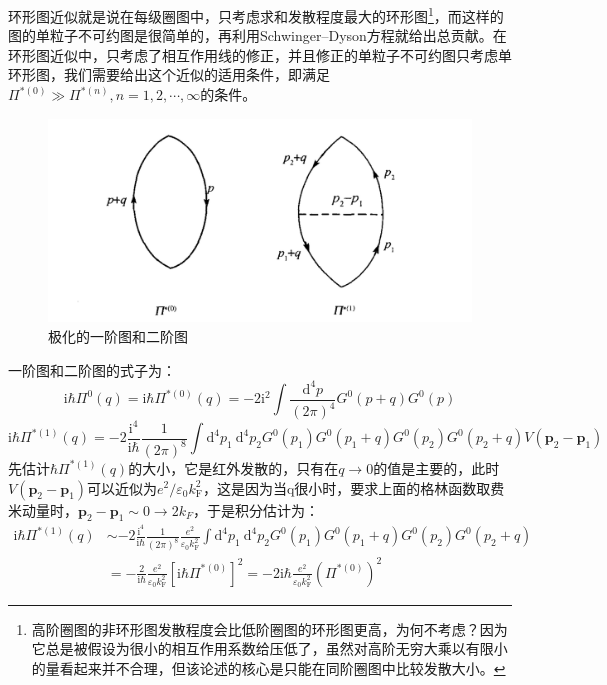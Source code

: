 \documentclass[10pt,openany]{book}
\theoremstyle{thmstyle} %
\theoremstyle{defstyle} %
\theoremstyle{prostyle} %
\begin{document}
环形图近似就是说在每级圈图中，只考虑求和发散程度最大的环形图\footnote{高阶圈图的非环形图发散程度会比低阶圈图的环形图更高，为何不考虑？因为它总是被假设为很小的相互作用系数给压低了，虽然对高阶无穷大乘以有限小的量看起来并不合理，但该论述的核心是只能在同阶圈图中比较发散大小。}，而这样的图的单粒子不可约图是很简单的，再利用Schwinger–Dyson方程就给出总贡献。在环形图近似中，只考虑了相互作用线的修正，并且修正的单粒子不可约图只考虑单环形图，我们需要给出这个近似的适用条件，即满足$ \Pi^{*(0)} \gg \Pi^{*(n)}, n=1,2, \cdots, \infty $的条件。
\begin{figure}[htbp]
  \centering
  \includegraphics*[scale=0.7]{Figures/极化的一阶图和二阶图.png}
  \caption{极化的一阶图和二阶图}
\end{figure} 
一阶图和二阶图的式子为：
\begin{equation}
  \mathrm{i} \hbar \Pi^0(q)=\mathrm{i} \hbar \Pi^{*(0)}(q)=-2 \mathrm{i}^2 \int \frac{\mathrm{d}^4 p}{(2 \pi)^4} G^0(p+q) G^0(p)
\end{equation}
\begin{equation}
  \mathrm{i} \hbar \Pi^{*(1)}(q)=-2 \frac{\mathrm{i}^4}{\mathrm{i} \hbar} \frac{1}{(2 \pi)^8} \int \mathrm{d}^4 p_1 \mathrm{~d}^4 p_2 G^0\left(p_1\right) G^0\left(p_1+q\right) G^0\left(p_2\right) G^0\left(p_2+q\right) V\left(\boldsymbol{p}_2-\boldsymbol{p}_1\right)
\end{equation}
先估计$ \hbar \Pi^{*(1)}(q) $的大小，它是红外发散的，只有在$ q\to0 $的值是主要的，此时$ V\left(\boldsymbol{p}_2-\boldsymbol{p}_1\right) $可以近似为$ e^2 / \varepsilon_0 k_{\mathrm{F}}^2 $，这是因为当q很小时，要求上面的格林函数取费米动量时，$ \boldsymbol{p}_2-\boldsymbol{p}_1\sim0\to2k_F $，于是积分估计为：
\begin{equation}
  \begin{aligned}
    \mathrm{i} \hbar \Pi^{*(1)}(q) & \sim-2 \frac{\mathrm{i}^4}{\mathrm{i} \hbar} \frac{1}{(2 \pi)^8} \frac{e^2}{\varepsilon_0 k_{\mathrm{F}}^2} \int \mathrm{d}^4 p_1 \mathrm{~d}^4 p_2 G^0\left(p_1\right) G^0\left(p_1+q\right) G^0\left(p_2\right) G^0\left(p_2+q\right) \\
    & =-\frac{2}{\mathrm{i} \hbar} \frac{e^2}{\varepsilon_0 k_{\mathrm{F}}^2}\left[\mathrm{i} \hbar \Pi^{*(0)}\right]^2=-2 \mathrm{i} \hbar \frac{e^2}{\varepsilon_0 k_{\mathrm{F}}^2}\left(\Pi^{*(0)}\right)^2
    \end{aligned}
\end{equation}   
\end{document}
